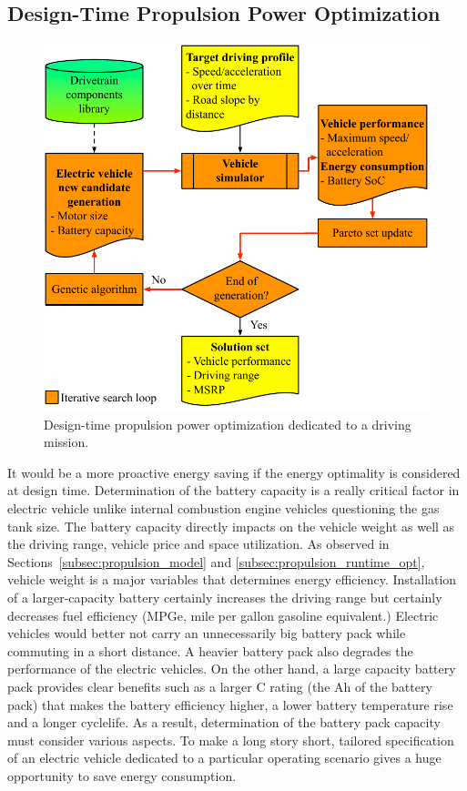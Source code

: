 \subsection{Design-Time Propulsion Power Optimization} \label{subsec:propulsion_design_time_opt}

\begin{figure}
\centering
\includegraphics[width=1.0\hsize]{Figures/Naehyuck_Chang/design_optimization.pdf}
\caption{Design-time propulsion power optimization dedicated to a driving mission.}
\label{fig:design_opt}
\end{figure} 


It would be a more proactive energy saving if the energy optimality is considered at design time. Determination of the battery capacity is a really critical factor in electric vehicle unlike internal combustion engine vehicles questioning the gas tank size. The battery capacity directly impacts on the vehicle weight as well as the driving range, vehicle price and space utilization. As observed in Sections~\ref{subsec:propulsion_model} and \ref{subsec:propulsion_runtime_opt}, vehicle weight is a major variables that determines energy efficiency. Installation of a larger-capacity battery certainly increases the driving range but certainly decreases fuel efficiency (MPGe, mile per gallon gasoline equivalent.) Electric vehicles would better not carry an unnecessarily big battery pack while commuting in a short distance. A heavier battery pack also degrades the performance of the electric vehicles. On the other hand, a large capacity battery pack provides clear benefits such as a larger C rating (the Ah of the battery pack) that makes the battery efficiency higher, a lower battery temperature rise and a longer cyclelife. As a result, determination of the battery pack capacity must consider various aspects. To make a long story short, tailored specification of an electric vehicle dedicated to a particular operating scenario gives a huge opportunity to save energy consumption.

